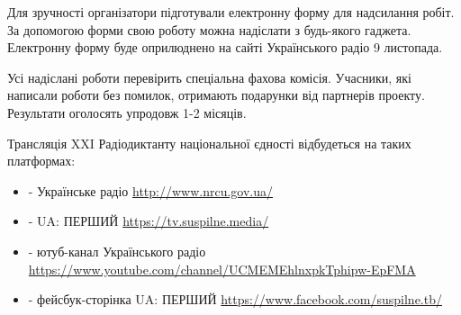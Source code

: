 Для зручності організатори підготували електронну форму для надсилання робіт.
За допомогою форми свою роботу можна надіслати з будь-якого гаджета. Електронну
форму буде оприлюднено на сайті Українського радіо 9 листопада.

Усі надіслані роботи перевірить спеціальна фахова комісія. Учасники, які
написали роботи без помилок, отримають подарунки від партнерів проекту.
Результати оголосять упродовж 1-2 місяців.

Трансляція XXI Радіодиктанту національної єдності відбудеться на таких
платформах:

\begin{itemize}
  \item - Українське радіо \url{http://www.nrcu.gov.ua/}
  \item - UA: ПЕРШИЙ \url{https://tv.suspilne.media/}
  \item - ютуб-канал Українського радіо \url{https://www.youtube.com/channel/UCMEMEhlnxpkTphipw-EpFMA}
  \item - фейсбук-сторінка UA: ПЕРШИЙ \url{https://www.facebook.com/suspilne.tb/}
\end{itemize}
